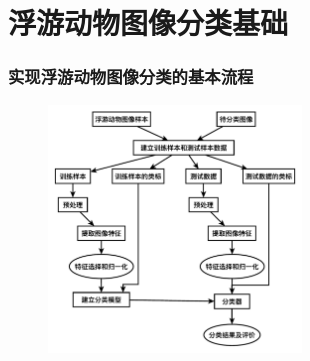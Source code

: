 \documentclass[notheorems,mathserif,table,compress]{beamer}  %
\begin{document}
\section{浮游动物图像分类基础}
\begin{frame}
\frametitle{实现浮游动物图像分类的基本流程}
\begin{figure}[!htb] %
\centering
\includegraphics[width=0.6\textwidth]{ClassificationFlowchart.pdf}
\end{figure}
\end{frame}
\end{document}
